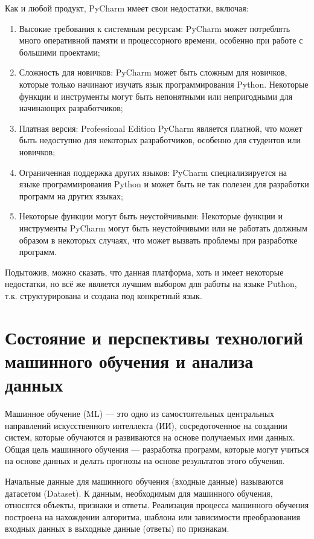     Как и любой продукт, PyCharm имеет свои недостатки, включая:
    \begin{enumerate}
        \item Высокие требования к системным ресурсам: PyCharm может потреблять много оперативной памяти и процессорного времени, особенно при работе с большими проектами;
        \item Сложность для новичков: PyCharm может быть сложным для новичков, которые только начинают изучать язык программирования Python. Некоторые функции и инструменты могут быть непонятными или непригодными для начинающих разработчиков;
        \item Платная версия: Professional Edition PyCharm является платной, что может быть недоступно для некоторых разработчиков, особенно для студентов или новичков;
        \item Ограниченная поддержка других языков: PyCharm специализируется на языке программирования Python и может быть не так полезен для разработки программ на других языках;
        \item Некоторые функции могут быть неустойчивыми: Некоторые функции и инструменты PyCharm могут быть неустойчивыми или не работать должным образом в некоторых случаях, что может вызвать проблемы при разработке программ.
    \end{enumerate}

    Подытожив, можно сказать, что данная платформа, хоть и имеет некоторые недостатки, но всё же является лучшим выбором для работы на языке Puthon, т.к. структурирована и создана под конкретный язык.

    \section{Состояние и перспективы технологий машинного обучения и анализа данных}
    Машинное обучение (ML) — это одно из самостоятельных центральных направлений искусственного интеллекта (ИИ), сосредоточенное на создании систем, которые обучаются и развиваются на основе получаемых ими данных. Общая цель машинного обучения — разработка программ, которые могут учиться на основе данных и делать прогнозы на основе результатов этого обучения.

    Начальные данные для машинного обучения (входные данные) называются датасетом (Dataset). К данным, необходимым для машинного обучения, относятся объекты, признаки и ответы. Реализация процесса машинного обучения построена на нахождении алгоритма, шаблона или зависимости  преобразования входных данных в выходные данные (ответы) по признакам. 
    
